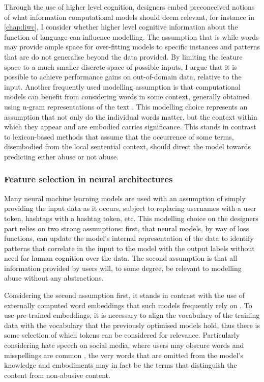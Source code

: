 Through the use of higher level cognition, designers embed preconceived notions of what information computational models should deem relevant, for instance in \autoref{chap:liwc}, I consider whether higher level cognitive information about the function of language can influence modelling. The assumption that is while words may provide ample space for over-fitting models to specific instances and patterns that are do not generalise beyond the data provided. By limiting the feature space to a much smaller discrete space of possible inputs, I argue that it is possible to achieve performance gains on out-of-domain data, relative to the input.
Another frequently used modelling assumption is that computational models can benefit from considering words in some context, generally obtained using n-gram representations of the text \citep{Waseem-Hovy:2016,Davidson:2017,Chiril:2019}. This modelling choice represents an assumption that not only do the individual words matter, but the context within which they appear and are embodied carries significance. This stands in contrast to lexicon-based methods \citep{Hurtlex:2019} that assume that the occurrence of some terms, disembodied from the local sentential context, should direct the model towards predicting either abuse or not abuse.

\subsubsection{Feature selection in neural architectures}

Many neural machine learning models are used with an assumption of simply providing the input data as it occurs, subject to replacing usernames with a user token, hashtags with a hashtag token, etc. This modelling choice on the designers part relies on two strong assumptions: first, that neural models, by way of loss functions, can update the model's internal representation of the data to identify patterns that correlate in the input to the model with the output labels without need for human cognition over the data. The second assumption is that all information provided by users will, to some degree, be relevant to modelling abuse without any abstractions.

Considering the second assumption first, it stands in contrast with the use of externally computed word embeddings that such models frequently rely on \citep{Kshirsagar:2018,Isaksen:2020}. To use pre-trained embeddings, it is necessary to align the vocabulary of the training data with the vocabulary that the previously optimised models hold, thus there is some selection of which tokens can be considered for relevance. Particularly considering hate speech on social media, where users may obscure words and misspellings are common \citep{Rottger:2021}, the very words that are omitted from the model's knowledge and embodiments may in fact be the terms that distinguish the content from non-abusive content.

